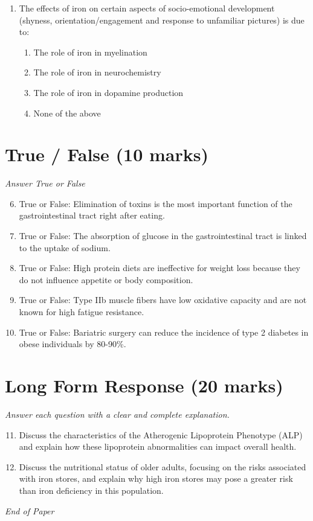 \documentclass[12pt]{article}
\begin{document}
\begin{enumerate}[label=\arabic*.]
\begin{enumerate}[label=(\alph*)]
    \item Only when intakes are less than those required for nutritional benefits
    \item Under no known conditions of usual intake
\end{enumerate}
\item The effects of iron on certain aspects of socio-emotional development (shyness, orientation/engagement and response to unfamiliar pictures) is due to:
\begin{enumerate}[label=(\alph*)]
    \item The role of iron in myelination
    \item The role of iron in neurochemistry
    \item The role of iron in dopamine production
    \item None of the above
\end{enumerate}
\end{enumerate}

\section*{True / False (10 marks)}
\textit{Answer True or False}
\begin{enumerate}[label=\arabic*.]
\setcounter{enumi}{5}
\item True or False: Elimination of toxins is the most important function of the gastrointestinal tract right after eating.
\item True or False: The absorption of glucose in the gastrointestinal tract is linked to the uptake of sodium.
\item True or False: High protein diets are ineffective for weight loss because they do not influence appetite or body composition.
\item True or False: Type IIb muscle fibers have low oxidative capacity and are not known for high fatigue resistance.
\item True or False: Bariatric surgery can reduce the incidence of type 2 diabetes in obese individuals by 80-90\%.
\end{enumerate}

\section*{Long Form Response (20 marks)}
\textit{Answer each question with a clear and complete explanation.}
\begin{enumerate}[label=\arabic*.]
\setcounter{enumi}{10}
\item Discuss the characteristics of the Atherogenic Lipoprotein Phenotype (ALP) and explain how these lipoprotein abnormalities can impact overall health.
\item Discuss the nutritional status of older adults, focusing on the risks associated with iron stores, and explain why high iron stores may pose a greater risk than iron deficiency in this population.
\end{enumerate}

\vfill
\noindent\textit{End of Paper}
\end{document}
